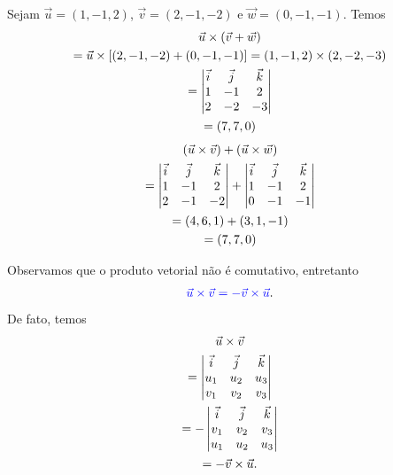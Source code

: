 \begin{ex}
  Sejam $\vec{u}=(1,-1,2)$, $\vec{v}=(2,-1,-2)$ e $\vec{w}=(0,-1,-1)$. Temos
  \begin{gather}
    \vec{u}\times(\vec{v}+\vec{w}) \\
    = \vec{u}\times \left[(2,-1,-2)+(0,-1,-1)\right]
    = (1,-1,2)\times (2,-2,-3) \\
    = \begin{vmatrix}
      \vec{i} & \vec{j} & \vec{k} \\
      1 & -1 & 2 \\
      2 & -2 & -3
    \end{vmatrix} \\
    = (7,7,0)  
  \end{gather}
  \begin{gather}
    (\vec{u}\times\vec{v}) + (\vec{u}\times\vec{w}) \\
        = \begin{vmatrix}
          \vec{i} & \vec{j} & \vec{k} \\
          1 & -1 & 2 \\
          2 & -1 & -2
        \end{vmatrix} + \begin{vmatrix}
          \vec{i} & \vec{j} & \vec{k} \\
          1 & -1 & 2 \\
          0 & -1 & -1
        \end{vmatrix} \\
        = (4,6,1) + (3,1,-1) \\
        = (7,7,0)
  \end{gather}
\end{ex}

Observamos que o {\color{blue}produto vetorial não é comutativo}, entretanto
\begin{equation}
  {\color{blue}\vec{u}\times\vec{v} = -\vec{v}\times\vec{u}}.
\end{equation}
De fato, temos
\begin{gather}
  \vec{u}\times\vec{v} \\
  = \begin{vmatrix}
    \vec{i} & \vec{j} & \vec{k} \\
    u_1 & u_2 & u_3 \\
    v_1 & v_2 & v_3                                    
  \end{vmatrix}\\
  = -\begin{vmatrix}
    \vec{i} & \vec{j} & \vec{k} \\
    v_1 & v_2 & v_3 \\
    u_1 & u_2 & u_3                                    
  \end{vmatrix}\\
  = -\vec{v}\times\vec{u}.
\end{gather}

